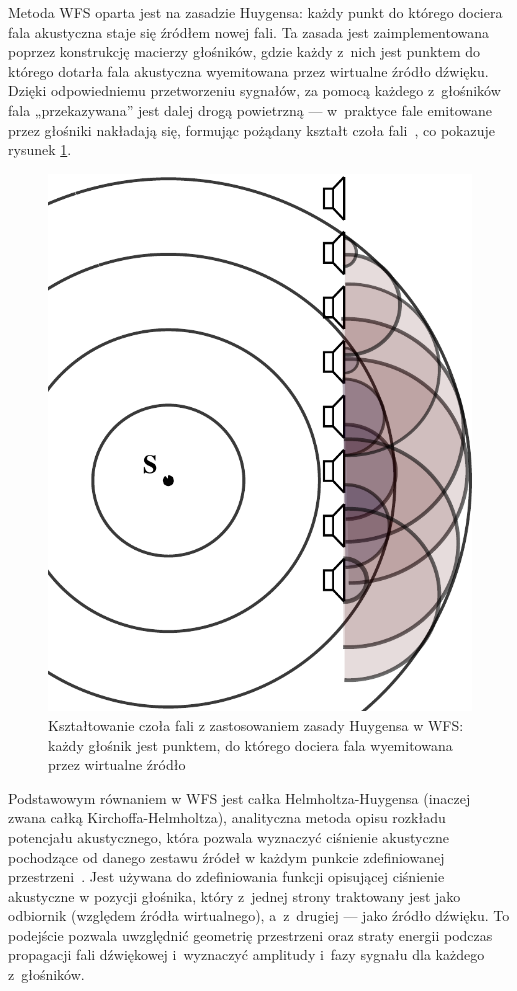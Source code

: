 \documentclass[12pt]{oska}
\begin{document}
Metoda WFS oparta jest na zasadzie Huygensa: każdy punkt do którego dociera
fala akustyczna staje się źródłem nowej fali. Ta zasada jest zaimplementowana
poprzez konstrukcję macierzy głośników, gdzie każdy z~nich jest punktem do
którego dotarła fala akustyczna wyemitowana przez wirtualne źródło dźwięku.
Dzięki odpowiedniemu przetworzeniu sygnałów, za pomocą każdego z~głośników fala
„przekazywana” jest dalej drogą powietrzną --- w~praktyce fale emitowane przez
głośniki nakładają się, formując pożądany kształt czoła
fali~\cite{hq_rendering}, co pokazuje rysunek
\ref{r:Huygens}.

\begin{figure}[!tbh]
  \centering
  \includegraphics[scale=.4]{vecgraphics/WFS_idea.pdf}
  \caption{Kształtowanie czoła fali z zastosowaniem zasady Huygensa w WFS: każdy głośnik jest punktem, do
  którego dociera fala wyemitowana przez wirtualne źródło}
  \label{r:Huygens}
\end{figure}

Podstawowym równaniem w WFS jest całka Helmholtza-Huygensa (inaczej zwana całką
Kirchoffa-Helmholtza), analityczna metoda opisu rozkładu potencjału akustycznego,
która pozwala wyznaczyć ciśnienie akustyczne pochodzące od danego zestawu
źródeł w każdym punkcie zdefiniowanej przestrzeni~\cite{snaka}. Jest używana do
zdefiniowania funkcji opisującej ciśnienie akustyczne w pozycji głośnika, który
z~jednej strony traktowany jest jako odbiornik (względem źródła wirtualnego),
a~z~drugiej --- jako źródło dźwięku. To podejście pozwala uwzględnić geometrię
przestrzeni oraz straty energii podczas propagacji fali dźwiękowej i~wyznaczyć
amplitudy i~fazy sygnału dla każdego z~głośników.
\end{document}
